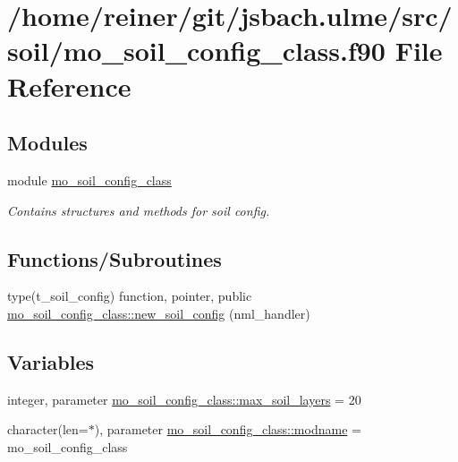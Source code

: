 \hypertarget{mo__soil__config__class_8f90}{}\section{/home/reiner/git/jsbach.ulme/src/soil/mo\+\_\+soil\+\_\+config\+\_\+class.f90 File Reference}
\label{mo__soil__config__class_8f90}
\subsection*{Modules}
\begin{DoxyCompactItemize}
\item 
module \hyperlink{namespacemo__soil__config__class}{mo\+\_\+soil\+\_\+config\+\_\+class}
\begin{DoxyCompactList}\small\item\em Contains structures and methods for soil config. \end{DoxyCompactList}\end{DoxyCompactItemize}
\subsection*{Functions/\+Subroutines}
\begin{DoxyCompactItemize}
\item 
type(t\+\_\+soil\+\_\+config) function, pointer, public \hyperlink{namespacemo__soil__config__class_a5093e53abf20433b31866a3ccf4a9632}{mo\+\_\+soil\+\_\+config\+\_\+class\+::new\+\_\+soil\+\_\+config} (nml\+\_\+handler)
\end{DoxyCompactItemize}
\subsection*{Variables}
\begin{DoxyCompactItemize}
\item 
integer, parameter \hyperlink{namespacemo__soil__config__class_a3a98563fab1a9b484ef3c2d6120c93e8}{mo\+\_\+soil\+\_\+config\+\_\+class\+::max\+\_\+soil\+\_\+layers} = 20
\item 
character(len=$\ast$), parameter \hyperlink{namespacemo__soil__config__class_a6b8b4145e195e3615319ed71a4d9d1bb}{mo\+\_\+soil\+\_\+config\+\_\+class\+::modname} = \textquotesingle{}mo\+\_\+soil\+\_\+config\+\_\+class\textquotesingle{}
\end{DoxyCompactItemize}
